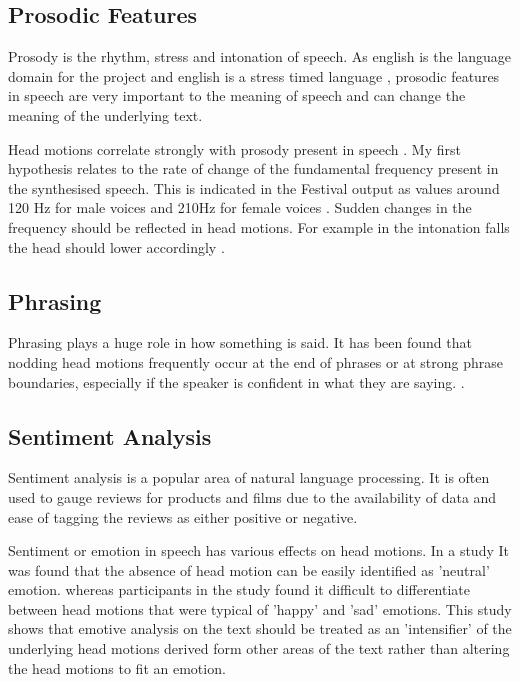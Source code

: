 \documentclass[bsc,frontabs,twoside,singlespacing,parskip]{infthesis}
\begin{document}
\subsection{Prosodic Features}

Prosody is the rhythm, stress and intonation of speech. As english is the language domain for the project and english is a stress timed language \cite{stress_timed}, prosodic features in speech are very important to the meaning of speech and can change the meaning of the underlying text.

Head motions correlate strongly with prosody present in speech \cite{vis_prosody}. My first hypothesis relates to the rate of change of the fundamental frequency present in the synthesised speech. This is indicated in the Festival output as values around 120 Hz for male voices and 210Hz for female voices \cite{f0_values}. Sudden changes in the frequency should be reflected in head motions. For example in the intonation falls the head should lower accordingly \cite{Kendon}.

\subsection{Phrasing}

Phrasing plays a huge role in how something is said. It has been found that nodding head motions frequently occur at the end of phrases or at strong phrase boundaries, especially if the speaker is confident in what they are saying. \cite{ishi2008}. 

\subsection{Sentiment Analysis}

Sentiment analysis is a popular area of natural language processing. It is often used to gauge reviews for products\cite{sentiment_online} and films\cite{sentiment_films} due to the availability of data and ease of tagging the reviews as either positive or negative.

Sentiment or emotion in speech has various effects on head motions. In a study It was found that the absence of head motion can be easily identified as 'neutral' emotion. \cite{emotion_head_motion} whereas participants in the study found it difficult to differentiate between head motions that were typical of 'happy' and 'sad' emotions. This study shows that emotive analysis on the text should be treated as an 'intensifier' of the underlying head motions derived form other areas of the text rather than altering the head motions to fit an emotion.
\end{document}
